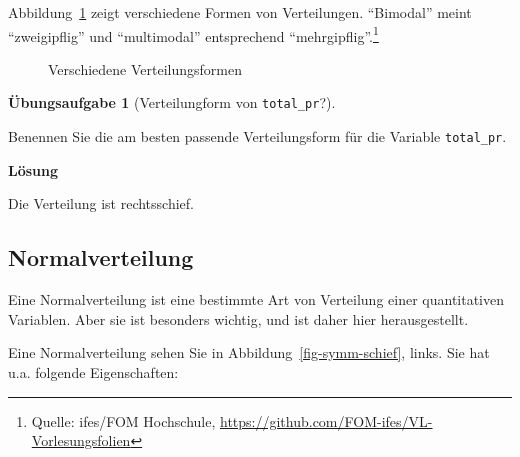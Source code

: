 \documentclass[
  letterpaper,
]{scrbook}
\theoremstyle{definition}
\theoremstyle{definition}
\theoremstyle{definition}
\newtheorem{exercise}{Übungsaufgabe}[chapter]
\theoremstyle{remark}
\begin{document}
Abbildung~\ref{fig-plot-distribs} zeigt verschiedene Formen von
Verteilungen. ``Bimodal'' meint ``zweigipflig'' und ``multimodal''
entsprechend ``mehrgipflig''.\footnote{Quelle: ifes/FOM Hochschule,
  \url{https://github.com/FOM-ifes/VL-Vorlesungsfolien}}

\begin{figure}


\caption{\label{fig-plot-distribs}Verschiedene Verteilungsformen}

\end{figure}%

\begin{exercise}[Verteilungform von
\texttt{total\_pr}?]\protect\hypertarget{exr-verteilungsform-total-pr}{}\label{exr-verteilungsform-total-pr}

Benennen Sie die am besten passende Verteilungsform für die Variable
\texttt{total\_pr}.

\textbf{Lösung}

Die Verteilung ist rechtsschief.

\end{exercise}

\subsection{Normalverteilung}\label{normalverteilung}

Eine Normalverteilung ist eine bestimmte Art von Verteilung einer
quantitativen Variablen. Aber sie ist besonders wichtig, und ist daher
hier herausgestellt.

Eine Normalverteilung sehen Sie in Abbildung~\ref{fig-symm-schief},
links. Sie hat u.a. folgende Eigenschaften:
\end{document}

